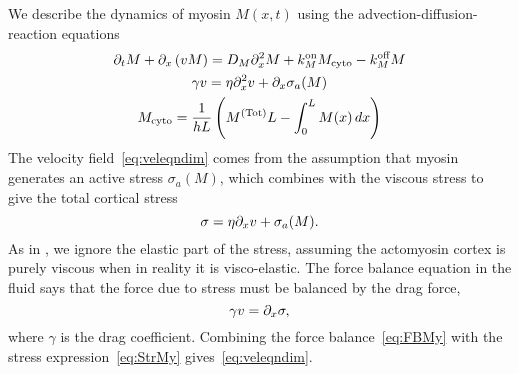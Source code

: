 \documentclass[11pt]{article}
\newcommand{\6}[1]{#1_{\text{6}}}
\newcommand{\3}[1]{#1_{\text{3}}}
\newcommand{\Tot}[1]{#1^\text{(Tot)}}
\newcommand{\My}[1]{#1_M}
\begin{document}
We describe the dynamics of myosin $M(x,t)$ using the advection-diffusion-reaction equations
\begin{subequations}
\label{eq:MyOnly}
\begin{gather}
\Dt M + \Dx \left(v M\right) = D_M \Dx^2 M +\My{\kon}M_\text{cyto} - \My{\koff} M \\
\label{eq:veleqndim}
\gamma v = \eta \Dx^2 v + \Dx \sigma_a(M)\\
M_\text{cyto} = \frac{1}{hL}\left(\Tot{M}L-\int_0^L M(x) \, dx\right)
\end{gather}
\end{subequations}
The velocity field\ \eqref{eq:veleqndim} comes from the assumption that myosin generates an active stress $\sigma_a(M)$, which combines with the viscous stress to give the total cortical stress
\begin{equation}
\label{eq:StrMy}
\sigma = \eta \partial_x{v} + \sigma_a(M).
\end{equation}
As in \cite{bois2011pattern}, we ignore the elastic part of the stress, assuming the actomyosin cortex is purely viscous when in reality it is visco-elastic. The force balance equation in the fluid says that the force due to stress must be balanced by the drag force, 
\begin{equation}
\label{eq:FBMy}
\gamma v = \partial_x \sigma,
\end{equation}
where $\gamma$ is the drag coefficient. Combining the force balance\ \eqref{eq:FBMy} with the stress expression\ \eqref{eq:StrMy} gives\ \eqref{eq:veleqndim}.
\end{document}

